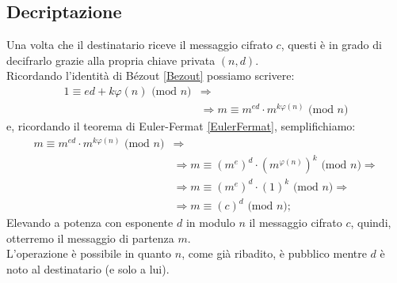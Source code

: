 \subsection{Decriptazione}
Una volta che il destinatario riceve il messaggio cifrato $c$, questi è in grado di decifrarlo grazie alla propria chiave privata $(n,d)$.\\
Ricordando l'identità di B\'ezout \eqref{Bezout} possiamo scrivere:
\begin{equation}
\begin{split}
1 \equiv ed+k\varphi(n) \text{ (mod $n$)} & \Longrightarrow\\
& \Longrightarrow m \equiv m^{ed} \cdot m^{k\varphi(n)} \text{ (mod $n$)}
\end{split}
\end{equation}
e, ricordando il teorema di Euler-Fermat \eqref{EulerFermat}, semplifichiamo:
\begin{equation}
\begin{split}
m \equiv m^{ed} \cdot m^{k\varphi(n)} \text{ (mod $n$)} & \Longrightarrow\\
& \Longrightarrow m \equiv \left(m^{e}\right)^{d} \cdot \left(m^{\varphi(n)}\right)^{k} \text{ (mod $n$)} \Longrightarrow \\
& \Longrightarrow m \equiv \left(m^{e}\right)^{d} \cdot \left(1\right)^{k} \text{ (mod $n$)} \Longrightarrow \\
& \Longrightarrow m \equiv \left(c\right)^{d} \text{ (mod $n$)};
\end{split}
\end{equation}
Elevando a potenza con esponente $d$ in modulo $n$ il messaggio cifrato $c$, quindi, otterremo il messaggio di partenza $m$.\\
L'operazione è possibile in quanto $n$, come già ribadito, è pubblico mentre $d$ è noto al destinatario (e solo a lui).